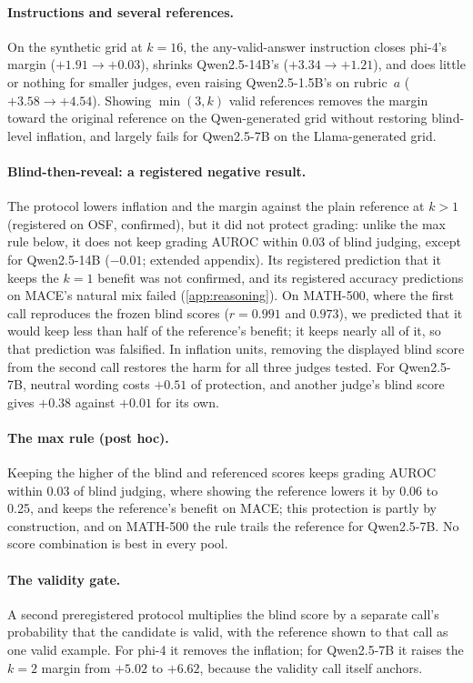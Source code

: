 \paragraph{Instructions and several references.}
On the synthetic grid at $k{=}16$, the any-valid-answer instruction closes phi-4's margin ($+1.91 \to +0.03$), shrinks Qwen2.5-14B's ($+3.34 \to +1.21$), and does little or nothing for smaller judges, even raising Qwen2.5-1.5B's on rubric~$a$ ($+3.58 \to +4.54$). Showing $\min(3,k)$ valid references removes the margin toward the original reference on the Qwen-generated grid without restoring blind-level inflation, and largely fails for Qwen2.5-7B on the Llama-generated grid.

\paragraph{Blind-then-reveal: a registered negative result.}
The protocol lowers inflation and the margin against the plain reference at $k{>}1$ (registered on OSF, confirmed), but it did not protect grading: unlike the max rule below, it does not keep grading AUROC within 0.03 of blind judging, except for Qwen2.5-14B ($-0.01$; extended appendix).\ph{} Its registered prediction that it keeps the $k{=}1$ benefit was not confirmed, and its registered accuracy predictions on \textsc{MACE}'s natural mix failed (\cref{app:reasoning}). On MATH-500, where the first call reproduces the frozen blind scores ($r=0.991$ and $0.973$), we predicted that it would keep less than half of the reference's benefit; it keeps nearly all of it, so that prediction was falsified. In inflation units, removing the displayed blind score from the second call restores the harm for all three judges tested. For Qwen2.5-7B, neutral wording costs $+0.51$  of protection, and another judge's blind score gives $+0.38$ against $+0.01$ for its own.\pre

\paragraph{The max rule (post hoc).}
Keeping the higher of the blind and referenced scores keeps grading AUROC within 0.03 of blind judging, where showing the reference lowers it by 0.06 to 0.25, and keeps the reference's benefit on \textsc{MACE}; this protection is partly by construction, and on MATH-500 the rule trails the reference for Qwen2.5-7B.\ph{} No score combination is best in every pool.

\paragraph{The validity gate.}
A second preregistered protocol multiplies the blind score by a separate call's probability that the candidate is valid, with the reference shown to that call as one valid example. For phi-4 it removes the inflation; for Qwen2.5-7B it raises the $k{=}2$ margin from $+5.02$ to $+6.62$, because the validity call itself anchors.
